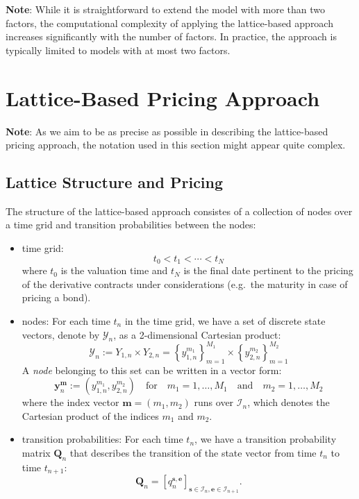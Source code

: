\documentclass{texyise}
\newcommand{\indexset}{\mathcal{I}}
\begin{document}
\textbf{Note}: While it is straightforward to extend the model with more than two factors, the computational complexity of applying the lattice-based approach increases significantly with the number of factors. In practice, the approach is typically limited to models with at most two factors.

\section{Lattice-Based Pricing Approach}
\label{S:lattice-based-pricing}

\textbf{Note}: As we aim to be as precise as possible in describing the lattice-based pricing approach, the notation used in this section might appear quite complex. 


\subsection{Lattice Structure and Pricing}

The structure of the lattice-based approach consistes of a collection of nodes over a time grid and transition probabilities between the nodes:
\begin{itemize}
    \item time grid:
    \begin{equation}
        t_0 < t_1 < \cdots < t_N \label{E:time-grid}
    \end{equation}
    where $t_0$ is the valuation time and $t_N$ is the final date pertinent to the pricing of the derivative contracts under considerations (e.g.\ the maturity in case of pricing a bond). 
    \item nodes: For each time $t_n$ in the time grid, we have a set of discrete state vectors, denote by $\mathcal{Y}_n$, as a 2-dimensional Cartesian product:
    \begin{equation}
        \mathcal{Y}_n := Y_{1,n} \times Y_{2,n} = \left\{ y_{1,n}^{m_1} \right\}_{m=1}^{M_1} \times \left\{ y_{2,n}^{m_2} \right\}_{m=1}^{M_2}
        \label{E:node-set}
    \end{equation}
    A {\em node} belonging to this set can be written in a vector form:
    \begin{equation}
        \bm{y}_{n}^{\bm{m}} := (y_{1,n}^{m_1}, y_{2,n}^{m_2}) \quad\text{for}\quad m_1 = 1, \ldots, M_1 \quad\text{and}\quad m_2 = 1, \ldots, M_2
    \end{equation}
    where the index vector $\bm{m} = (m_1, m_2)$ runs over $\indexset_n$, which denotes the Cartesian product of the indices $m_1$ and $m_2$.

    \item transition probabilities: For each time $t_n$, we have a transition probability matrix $\bm{Q}_n$ that describes the transition of the state vector from time $t_n$ to time $t_{n+1}$:
    \begin{equation}
        \bm{Q}_n = \left[ q_{n}^{\bm{s},\bm{e}} \right]_{\bm{s} \in \indexset_n, \bm{e} \in \indexset_{n+1}}.
    \end{equation} 

\end{itemize}
\end{document}
